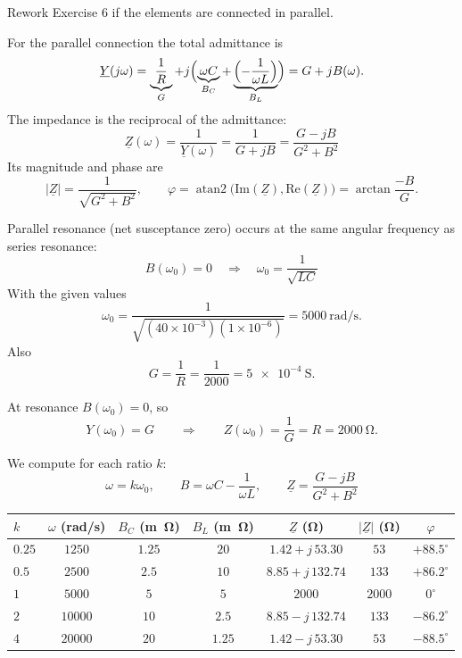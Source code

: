 \documentclass[11pt,a4paper]{article}
\newcounter{exercise}
\newenvironment{exercise}[1][]
  {\refstepcounter{exercise}%
   \begin{tcolorbox}[enhanced, breakable, width=\textwidth,
     colback=blue!5!white,colframe=blue!60!black,
     fonttitle=\bfseries\large,
     title=Exercise~\theexercise:~#1]}
  {\end{tcolorbox}}
\newif\ifshowsolutions
\newenvironment{solution}
  {\ifshowsolutions
     \begin{tcolorbox}[enhanced, breakable, width=\textwidth,
       colback=green!5!white,colframe=green!50!black,
       fonttitle=\bfseries\large,
       title=Solution]}
  {\end{tcolorbox}\fi}
\begin{document}
\begin{exercise}[Parallel Resonance]
Rework Exercise 6 if the elements are connected in parallel.
\end{exercise}

\ifshowsolutions
\begin{solution}
For the parallel connection the total admittance is
\[
\underline{Y}(j\omega) = \underbrace{\frac{1}{R}}_{G} + j\Bigl(\underbrace{\omega C}_{B_C} + \underbrace{\Bigl(-\frac{1}{\omega L}\Bigr)}_{B_L}\Bigr) = G + jB(\omega).
\]
The impedance is the reciprocal of the admittance:
\[
\underline{Z}(\omega) = \frac{1}{\underline{Y}(\omega)} = \frac{1}{G+jB} = \frac{G-jB}{G^2+B^2}
\]
Its magnitude and phase are
\[
|\underline{Z}|=\frac{1}{\sqrt{G^2+B^2}},\qquad \varphi = \operatorname{atan2}\bigl(\text{Im}(\underline{Z}),\text{Re}(\underline{Z})\bigr) = \arctan\!\frac{-B}{G}.
\]

Parallel resonance (net susceptance zero) occurs at the same angular frequency as series resonance:
\[
B(\omega_0) = 0 \quad\Rightarrow\quad \omega_0 = \frac{1}{\sqrt{LC}}
\]
With the given values
\[
\omega_0 = \frac{1}{\sqrt{(40\times10^{-3})(1\times10^{-6})}} = \SI{5000}{\radian\per\second}.
\]
Also
\[
G = \frac{1}{R} = \frac{1}{2000} = \SI{5e-4}{\siemens}.
\]

At resonance $B(\omega_0)=0$, so
\[
Y(\omega_0) = G \qquad\Rightarrow\qquad Z(\omega_0) = \frac{1}{G} = R = \SI{2000}{\ohm}.
\]

We compute for each ratio \(k\):
\[
\omega = k\omega_0,\qquad B = \omega C-\frac{1}{\omega L},\qquad \underline{Z} = \frac{G-jB}{G^2+B^2}
\]

\bigskip
\begin{tabular}{@{}lcccccc@{}}
\toprule
$k$ & $\omega$ (rad/s) & $B_C$ (\si{m\ohm}) & $B_L$ (\si{m\ohm}) & $\underline{Z}$ (\si{\ohm}) & $|\underline{Z}|$ (\si{\ohm}) & $\varphi$ \\
\midrule
$0.25$ & $1250$ & $1.25$ & $20$ & $1.42 + j\,53.30$ & $53$ & $+88.5^\circ$ \\[4pt]
$0.5$ & $2500$ & $2.5$ & $10$ & $8.85 + j\,132.74$ & $133$ & $+86.2^\circ$ \\[4pt]
$1$ & $5000$ & $5$ & $5$ & $2000$ & $2000$ & $0^\circ$ \\[4pt]
$2$ & $10000$ & $10$ & $2.5$ & $8.85 - j\,132.74$ & $133$ & $-86.2^\circ$ \\[4pt]
$4$ & $20000$ & $20$ & $1.25$ & $1.42 - j\,53.30$ & $53$ & $-88.5^\circ$ \\
\bottomrule
\end{tabular}


\end{solution}
\end{document}
